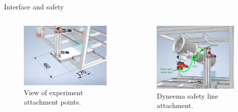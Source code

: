 \documentclass[11pt, aspectratio=169]{beamer}
\begin{document}
\begin{frame}{Interface and safety}
	\begin{columns}[t]
		\begin{column}{0.45\textwidth}
			\begin{figure}
				\centering
				\includegraphics[width=\textwidth]{figures/Mechanical/Interface.png}
				\caption{View of experiment attachment points.}
				\label{img::mech2}
			\end{figure}
		\end{column}
		\begin{column}{0.45\textwidth}
			\begin{figure}
				\centering
				\includegraphics[width=\textwidth]{figures/Mechanical/dyneema.png}
				\caption{Dyneema safety line attachment.}
				\label{img::mech3}
			\end{figure}
		\end{column}
	\end{columns}
\end{frame}
\end{document}
